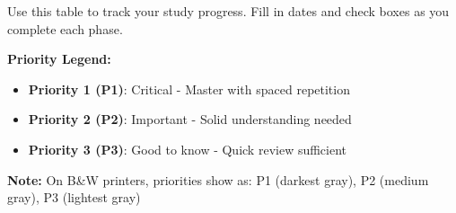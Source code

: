 \documentclass[10pt]{article}
\begin{document}
Use this table to track your study progress. Fill in dates and check boxes as you complete each phase.

\textbf{Priority Legend:}
\begin{itemize}
\item \colorbox{priority1}{\textbf{Priority 1 (P1)}}: Critical - Master with spaced repetition
\item \colorbox{priority2}{\textbf{Priority 2 (P2)}}: Important - Solid understanding needed
\item \colorbox{priority3}{\textbf{Priority 3 (P3)}}: Good to know - Quick review sufficient
\end{itemize}

\textbf{Note:} On B\&W printers, priorities show as: P1 (darkest gray), P2 (medium gray), P3 (lightest gray)
\end{document}
